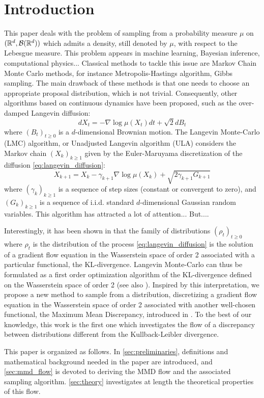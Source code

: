 
\section{Introduction}

This paper deals with the problem of sampling from a probability measure $\mu$ on $({{\mathbb R}}^d,\mathcal{B}({{\mathbb R}}^d))$ which admits a density, still denoted by $\mu$, with respect to the Lebesgue measure.
This problem appears in machine learning, Bayesian inference, computational physics... Classical methods to tackle this issue are Markov Chain Monte Carlo methods, for instance Metropolis-Hastings algorithm, Gibbs sampling. The main drawback of these methods is that one needs to choose an appropriate proposal distribution, which is not trivial. Consequently, other algorithms based on continuous dynamics have been proposed, such as the over-damped Langevin diffusion:
\begin{equation}\label{eq:langevin_diffusion}
dX_t= -\nabla \log \mu (X_t)dt+\sqrt{2}dB_t
\end{equation}
where $(B_t)_{t\ge0}$ is a $d$-dimensional Brownian motion. The Langevin Monte-Carlo (LMC) algorithm, or Unadjusted Langevin algorithm (ULA) considers the Markov chain $(X_k)_{k\ge1 }$ given by the Euler-Maruyama discretization of the diffusion \eqref{eq:langevin_diffusion}:
\begin{equation}
X_{k+1} = X_k - \gamma_{k+1}\nabla \log \mu(X_k) + \sqrt{2\gamma_{k+1}G_{k+1}}
\end{equation}
where $(\gamma_k)_{k\ge1}$ is a sequence of step sizes (constant or convergent to zero), and
$(G_k)_{k \ge 1}$ is a sequence of i.i.d. standard $d$-dimensional Gaussian random variables. This algorithm has attracted a lot of attention... But....

Interestingly, it has been shown in \cite{jordan1998variational} that the family of distributions $(\rho_t)_{t\ge 0}$ where $\rho_t$ is the distribution of the process \eqref{eq:langevin_diffusion} is the solution of a gradient
flow equation in the Wasserstein space of order 2 associated with a particular functional, the KL-divergence. Langevin Monte-Carlo can thus be formulated as a first order optimization algorithm of the KL-divergence defined on the Wasserstein space of order 2 (see also \cite{durmus2018analysis,bernton2018langevin}). Inspired by this interpretation, we propose a new method to sample from a distribution, discretizing a gradient
flow equation in the Wasserstein space of order 2 associated with another well-chosen functional, the Maximum Mean Discrepancy, introduced in \cite{gretton2012kernel}. To the best of our knowledge, this work is the first one which investigates the flow of a discrepancy between distributions different from the Kullback-Leibler divergence. 


This paper is organized as follows. In \cref{sec:preliminaries}, definitions and mathematical background needed in the paper are introduced, and \cref{sec:mmd_flow} is devoted to deriving the MMD flow and the associated sampling algorithm.
\cref{sec:theory} investigates at length the theoretical properties of this flow. 